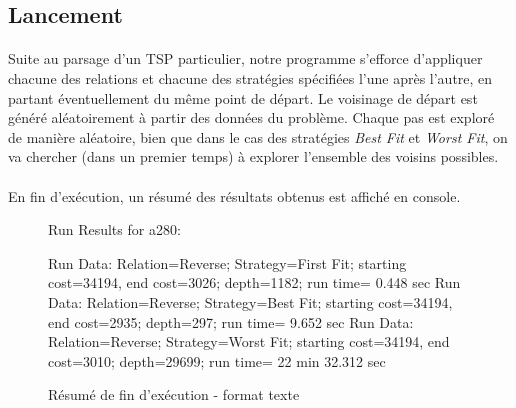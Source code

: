 \documentclass[a4paper,10pt]{report}
\begin{document}
\subsection{Lancement}

\paragraph{}
  Suite au parsage d'un TSP particulier, notre programme s'efforce d'appliquer
chacune des relations et chacune des stratégies spécifiées l'une après l'autre,
en partant éventuellement du même point de départ. Le voisinage de départ est
généré aléatoirement à partir des données du problème. Chaque pas est exploré de
manière aléatoire, bien que dans le cas des stratégies \textit{Best Fit} et
\textit{Worst Fit}, on va chercher (dans un premier temps) à explorer l'ensemble
des voisins possibles.

\paragraph{}
En fin d'exécution, un résumé des résultats obtenus est affiché en console.

\begin{figure}[h]
Run Results for a280:
 \begin{center}
Run Data: Relation=Reverse;	Strategy=First Fit;	starting cost=34194,
  end cost=3026;	depth=1182;	run time= 0.448 sec\linebreak
Run Data: Relation=Reverse;	Strategy=Best Fit;	starting cost=34194,
  end cost=2935;	depth=297;	run time= 9.652 sec\linebreak
Run Data: Relation=Reverse;	Strategy=Worst Fit;	starting cost=34194,
  end cost=3010;	depth=29699;	run time= 22 min 32.312 sec\linebreak
 \end{center}
  \label{a280-sample-results}
  \caption{Résumé de fin d'exécution - format texte}
\end{figure}
\end{document}
